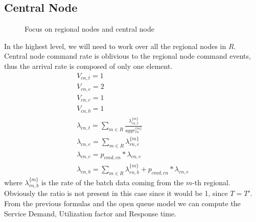 \documentclass[11pt]{article}
\begin{document}
\subsection{Central Node}
\begin{figure}[H]
	\centering
	\hspace*{-3.7cm}
	\frame{}
	\caption{Focus on regional nodes and central node}
\end{figure}
In the highest level, we will need to work over all the regional nodes in $R$.\\
Central node command rate is oblivious to the regional node command events, thus the arrival rate is composed of only one element.
\begin{equation}
	\begin{array}{l}
		V_{cn, t} = 1 \\
		V_{cn, e} = 2 \\ %
		V_{cn, c} = 1 \\
		V_{cn, b} = 1 \\
        \lambda_{cn, t} = \sum\limits_{m \in R}{ \frac{\lambda^{\{m\}}_{rn, t}}{aggr^{\{ m \}}_{rn}}}  \\
        \lambda_{cn, e} = \sum\limits_{m \in R}{\lambda^{\{m\}}_{rn, e}} \\
		\lambda_{cn, c} = p_{cmd,cn} * \lambda_{cn, e} \\
        \lambda_{cn, b} = \sum\limits_{m \in R}{\lambda^{\{ m \}}_{rn, b}} + p_{cmd,cn} * \lambda_{cn, e}
	\end{array}
\end{equation}
where $\lambda^{\{ m \}}_{rn, b}$ is the rate of the batch data coming from the $m$-th regional.
Obviously the ratio is not present in this case since it would be 1, since $T = T'$.\\
From the previous formulas and the open queue model we can compute the Service Demand, Utilization factor and Response time.
\end{document}
